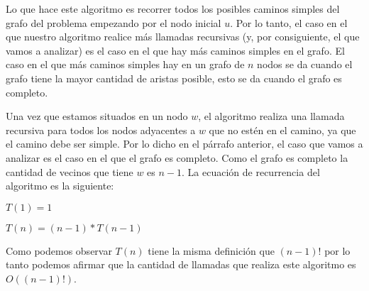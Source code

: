Lo que hace este algoritmo es recorrer todos los posibles caminos simples del grafo del problema empezando por el nodo inicial $u$. Por lo tanto, el caso en el que nuestro algoritmo realice más llamadas recursivas (y, por consiguiente, el que vamos a analizar) es el caso en el que hay más caminos simples en el grafo. El caso en el que más caminos simples hay en un grafo de $n$ nodos se da cuando el grafo tiene la mayor cantidad de aristas posible, esto se da cuando el grafo es completo. 

Una vez que estamos situados en un nodo $w$, el algoritmo realiza una llamada recursiva para todos los nodos adyacentes a $w$ que no estén en el camino, ya que el camino debe ser simple. Por lo dicho en el párrafo anterior, el caso que vamos a analizar es el caso en el que el grafo es completo. Como el grafo es completo la cantidad de vecinos que tiene $w$ es $n-1$. La ecuación de recurrencia del algoritmo es la siguiente:

\begin{center}
 $T(1) = 1$ 
 
 $T(n) = (n-1)*T(n-1)$
\end{center}

Como podemos observar $T(n)$ tiene la misma definición que $(n-1)!$ por lo tanto podemos afirmar que la cantidad de llamadas que realiza este algoritmo es $O((n-1)!)$.